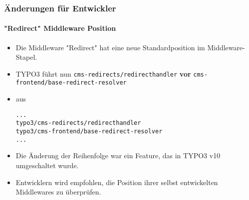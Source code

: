 %

\begin{frame}[fragile]
	\frametitle{Änderungen für Entwickler}
	\framesubtitle{"Redirect" Middleware Position}

	\lstset{basicstyle=\tiny\ttfamily}

	\begin{itemize}
		\item Die Middleware "Redirect" hat eine neue Standardposition im Middleware-Stapel.
		\item TYPO3 führt nun
			\small\texttt{cms-redirects/redirecthandler}\normalsize\newline
			\textbf{vor}
			\texttt{cms-frontend/base-redirect-resolver}\normalsize
 		\item aus
\begin{lstlisting}
...
typo3/cms-redirects/redirecthandler
typo3/cms-frontend/base-redirect-resolver
...
\end{lstlisting}

		\item Die Änderung der Reihenfolge war ein Feature, das in TYPO3 v10 umgeschaltet wurde.
		\item Entwicklern wird empfohlen, die Position ihrer selbst entwickelten Middlewares zu überprüfen.

	\end{itemize}

\end{frame}

